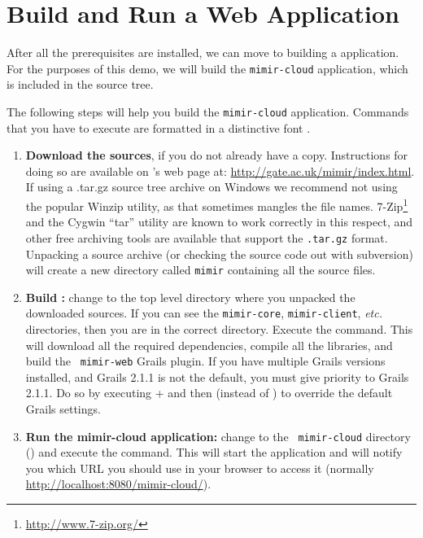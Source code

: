 \section{Build and Run a \Mimir{} Web Application}
%
After all the prerequisites are installed, we can move to building a \Mimir{}
application. For the purposes of this demo, we will build the {\tt mimir-cloud}
application, which is included in the source tree.

The following steps will help you build the {\tt mimir-cloud} application.
Commands that you have to execute are formatted in a distinctive font
.
\begin{enumerate}
  \item {\bf Download the \Mimir{} sources}, if you do not already have a copy.
  Instructions for doing so are available on \Mimir{}'s web page at:
  \url{http://gate.ac.uk/mimir/index.html}.
  If using a .tar.gz source tree archive on Windows we recommend not using the
  popular Winzip utility, as that sometimes mangles the file names. 
  7-Zip\footnote{\url{http://www.7-zip.org/}} and the Cygwin ``tar'' utility are
  known to work correctly in this respect, and other free archiving tools are 
  available that support the {\tt .tar.gz} format.
  Unpacking a source archive (or checking the source code out with subversion)
  will create a new directory called {\tt mimir} containing all the source files.
  \item {\bf Build \Mimir{}:} change to the top level directory where you
  unpacked the downloaded \Mimir{} sources. If you can see the {\tt mimir-core},
  {\tt mimir-client}, {\em etc.} directories, then you are in the correct
  directory. Execute the  command. This will download all the
  required dependencies, compile all the \Mimir{} libraries, and build the {\tt
  mimir-web} Grails plugin.
  If you have multiple Grails versions installed, and Grails 2.1.1 is not the
  default, you must give priority to Grails 2.1.1.  Do so by executing
   +  and then 
   (instead of ) to
  override the default Grails settings.
  \item {\bf Run the mimir-cloud application:}  change to the {\tt
  mimir-cloud} directory () and execute the  command. This will start the application and will notify you which
  URL you should use in your browser to access it (normally
  \url{http://localhost:8080/mimir-cloud/}).
\end{enumerate}
%

